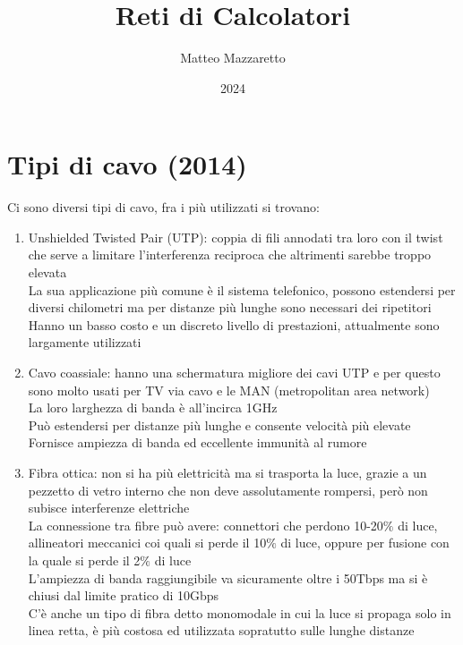 \documentclass[10pt,oneside,a4paper]{article}
\title{Reti di Calcolatori}
\author{Matteo Mazzaretto}
\date{2024}
\begin{document}
\maketitle
\begin{center}
\renewcommand{\contentsname}{Indice}
\tableofcontents
\end{center}
\newpage
\setcounter{page}{1}
\section{Tipi di cavo (2014)}
Ci sono diversi tipi di cavo, fra i più utilizzati si trovano:\\
\begin{enumerate}
\item Unshielded Twisted Pair (UTP): coppia di fili annodati tra loro con il twist che serve a limitare l'interferenza reciproca che altrimenti sarebbe troppo elevata\\
La sua applicazione più comune è il sistema telefonico, possono estendersi per diversi chilometri ma per distanze più lunghe sono necessari dei ripetitori\\
Hanno un basso costo e un discreto livello di prestazioni, attualmente sono largamente utilizzati
\item Cavo coassiale: hanno una schermatura migliore dei cavi UTP e per questo sono molto usati per TV via cavo e le MAN (metropolitan area network)\\
La loro larghezza di banda è all'incirca 1GHz\\
Può estendersi per distanze più lunghe e consente velocità più elevate\\
Fornisce ampiezza di banda ed eccellente immunità al rumore
\item Fibra ottica: non si ha più elettricità ma si trasporta la luce, grazie a un pezzetto di vetro interno che non deve assolutamente rompersi, però non subisce interferenze elettriche\\
La connessione tra fibre può avere: connettori che perdono 10-20$\%$ di luce, allineatori meccanici coi quali si perde il 10$\%$ di luce, oppure per fusione con la quale si perde il 2$\%$ di luce\\
L'ampiezza di banda raggiungibile va sicuramente oltre i 50Tbps ma si è chiusi dal limite pratico di 10Gbps\\
C'è anche un tipo di fibra detto monomodale in cui la luce si propaga solo in linea retta, è più costosa ed utilizzata sopratutto sulle lunghe distanze
\end{enumerate}
\end{document}
